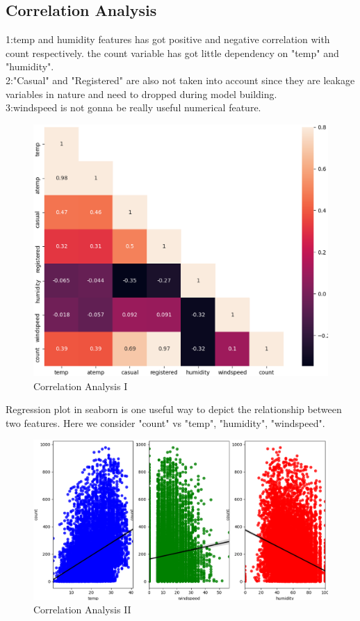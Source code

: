 \documentclass{amsart}
\begin{document}
\subsection{Correlation Analysis}
1:temp and humidity features has got positive and negative correlation with count respectively. the count variable has got little dependency on "temp" and "humidity". \\
2:"Casual" and "Registered" are also not taken into account since they are leakage variables in nature and need to dropped during model building. \\
3:windspeed is not gonna be really useful numerical feature.
\begin{figure}[htbp]
	\includegraphics[scale=0.5]{./figure/Figure_3.eps}
	\caption{Correlation Analysis I}
\end{figure}

Regression plot in seaborn is one useful way to depict the relationship between two features. Here we consider "count" vs "temp", "humidity", "windspeed".
\begin{figure}[htbp]
	\includegraphics[scale=0.5]{./figure/Figure_4.eps}
	\caption{Correlation Analysis II}
\end{figure}
\end{document}
